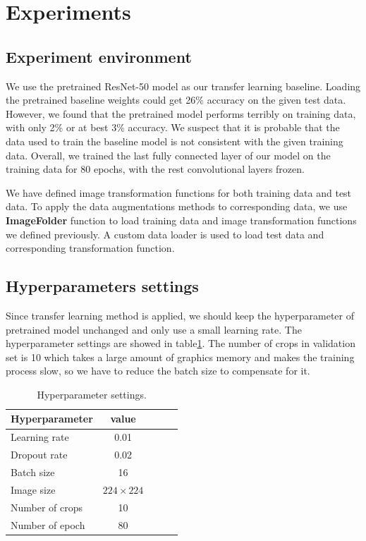 \documentclass{article}
\begin{document}
\section{Experiments}
\label{sec:experiments}
\subsection{Experiment environment}
We use the pretrained ResNet-50 model as our transfer learning baseline. Loading the pretrained baseline weights could get 26\% accuracy on the given test data. However, we found that the pretrained model performs terribly on training data, with only 2\% or at best 3\% accuracy. We suspect that it is probable that the data used to train the baseline model is not consistent with the given training data. Overall, we trained the last fully connected layer of our model on the training data for 80 epochs, with the rest convolutional layers frozen. 

We have defined image transformation functions for both training data and test data. To apply the data augmentations methods to corresponding data, we use \textbf{ImageFolder} function to load training data and image transformation functions we defined previously. A custom data loader is used to load test data and corresponding transformation function. 
\subsection{Hyperparameters settings}
Since transfer learning method is applied, we should keep the hyperparameter of pretrained model unchanged and only use a small learning rate. The hyperparameter settings are showed in table\ref{tab:parameters}. The number of crops in validation set is 10 which takes a large amount of graphics memory and makes the training process slow, so we have to reduce the batch size to compensate for it. 

\begin{table}[htb]
\vskip 3mm
\begin{center}
\begin{small}
\begin{sc}
\begin{tabular}{lcccr}
\hline
Hyperparameter & value \\
\hline
Learning rate    & 0.01 \\
Dropout rate & 0.02\\
Batch size & 16\\
Image size & $224 \times 224$\\
Number of crops & 10\\
Number of epoch & 80\\

\hline
\end{tabular}
\end{sc}
\caption{Hyperparameter settings.}
\label{tab:parameters}
\end{small}
\end{center}
\vskip -3mm
\end{table}
\end{document}
